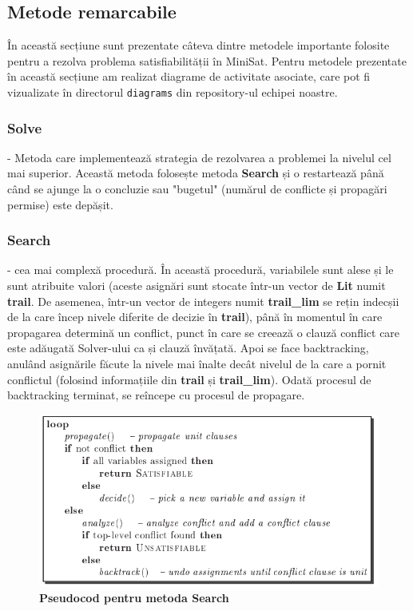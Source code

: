 \documentclass{llncs}
\begin{document}
\subsection{Metode remarcabile}
\label{sec:metode_remarcabile}

În această secțiune sunt prezentate câteva dintre metodele importante folosite pentru a rezolva problema satisfiabilității în MiniSat. Pentru metodele prezentate în această secțiune am realizat diagrame de activitate asociate, care pot fi vizualizate în directorul \texttt{diagrams} din repository-ul echipei noastre\cite{ref_MiniSat_our_fork}.
\subsubsection{Solve} - Metoda care implementează strategia de rezolvarea a problemei la nivelul cel mai superior. Această metoda folosește metoda \textbf{Search} și o restartează până când se ajunge la o concluzie sau "bugetul" (numărul de conflicte și propagări permise) este depășit.
\subsubsection{Search} - cea mai complexă procedură. În această procedură, variabilele sunt alese și le sunt atribuite valori (aceste asignări sunt stocate într-un vector de \textbf{Lit} numit \textbf{trail}. De asemenea, într-un vector de integers numit \textbf{trail\_lim} se rețin indecșii de la care încep nivele diferite de decizie în \textbf{trail}), până în momentul în care propagarea determină un conflict, punct în care se creează o clauză conflict care este adăugată Solver-ului ca și clauză învățată. Apoi se face backtracking, anulând asignările făcute la nivele mai înalte decât nivelul de la care a pornit conflictul (folosind informațiile din \textbf{trail} și \textbf{trail\_lim}). Odată procesul de backtracking terminat, se reîncepe cu procesul de propagare.

\begin{figure}[h]
\centering
\includegraphics[width=1\textwidth]{resources/search_pseudocode.png}
\caption{\textbf{Pseudocod pentru metoda \textbf{Search}}\cite{ref_MiniSat_Extensible_SAT_Paper} }
\end{figure}
\end{document}
